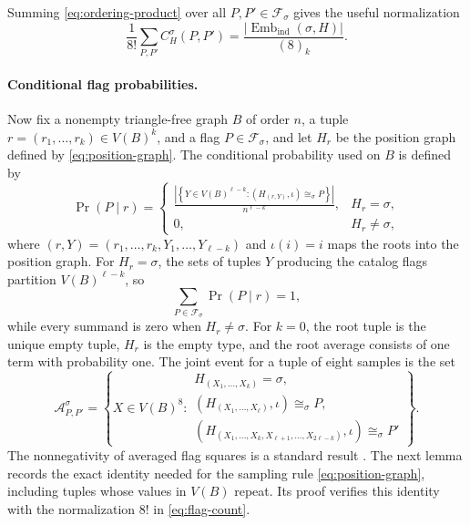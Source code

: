 \documentclass[11pt]{article}
\begin{document}
Summing \eqref{eq:ordering-product} over all $P,P'\in\mathcal F_\sigma$ gives the useful normalization
\[
\frac1{8!}\sum_{P,P'}C_H^\sigma(P,P')
=\frac{|\operatorname{Emb}_{\mathrm{ind}}(\sigma,H)|}{(8)_k}.
\]
\paragraph{Conditional flag probabilities.}
Now fix a nonempty triangle-free graph $B$ of order $n$, a tuple $r=(r_1,\ldots,r_k)\in V(B)^k$, and a flag $P\in\mathcal F_\sigma$, and let $H_r$ be the position graph defined by \eqref{eq:position-graph}.
The conditional probability used on $B$ is defined by
\begin{equation}\label{eq:conditional-probability}
\Pr(P\mid r)=
\begin{cases}
\displaystyle
\frac{\left|\left\{Y\in V(B)^{\ell-k}:
(H_{(r,Y)},\iota)\cong_\sigma P\right\}\right|}
{n^{\ell-k}},
& H_r=\sigma,\\[6pt]
0,& H_r\ne\sigma,
\end{cases}
\end{equation}
where $(r,Y)=(r_1,\ldots,r_k,Y_1,\ldots,Y_{\ell-k})$ and $\iota(i)=i$ maps the roots into the position graph.
For $H_r=\sigma$, the sets of tuples $Y$ producing the catalog flags partition $V(B)^{\ell-k}$, so
\[
\sum_{P\in\mathcal F_\sigma}\Pr(P\mid r)=1,
\]
while every summand is zero when $H_r\ne\sigma$.
For $k=0$, the root tuple is the unique empty tuple, $H_r$ is the empty type, and the root average consists of one term with probability one.
The joint event for a tuple of eight samples is the set
\begin{equation}\label{eq:joint-event}
\mathcal A^\sigma_{P,P'}=
\left\{X\in V(B)^8:
\begin{array}{l}
H_{(X_1,\ldots,X_k)}=\sigma,\\
(H_{(X_1,\ldots,X_\ell)},\iota)\cong_\sigma P,\\
(H_{(X_1,\ldots,X_k,X_{\ell+1},\ldots,X_{2\ell-k})},\iota)
\cong_\sigma P'
\end{array}\right\}.
\end{equation}
The nonnegativity of averaged flag squares is a standard result
\cite[Theorem~3.1(a)]{Razborov}.
The next lemma records the exact identity needed for the sampling rule
\eqref{eq:position-graph}, including tuples whose values in $V(B)$ repeat.
Its proof verifies this identity with the normalization $8!$ in
\eqref{eq:flag-count}.
\end{document}
